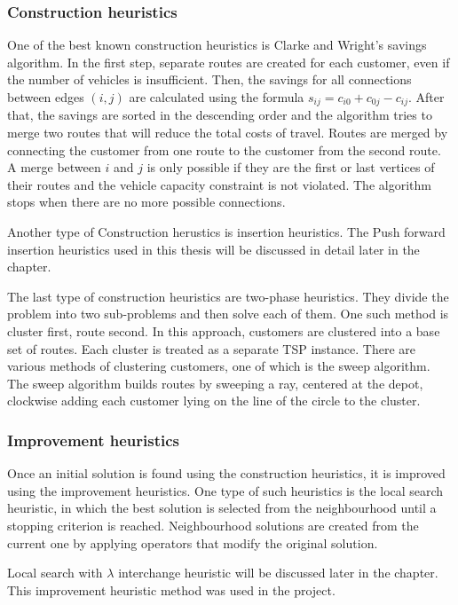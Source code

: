 \documentclass[a4paper,twoside,12pt]{book}
\begin{document}
\subsubsection{Construction heuristics}
One of the best known construction heuristics is Clarke and Wright's savings algorithm. In the first step, separate routes are created for each customer, even if the number of vehicles is insufficient. Then, the  savings for all connections between edges $(i, j)$ are calculated using the formula $s_{ij} = c_{i0} + c_{0j} - c_{ij}$. After that, the savings are sorted in the descending order and the algorithm tries to merge two routes that will reduce the total costs of travel. Routes are merged by connecting the customer from one route to the customer from the second route. A merge between $i$ and $j$ is only possible if they are the first or last vertices of their routes and the vehicle capacity constraint is not violated. The algorithm stops when there are no more possible connections.

Another type of Construction herustics is insertion heuristics. The Push forward insertion heuristics used in this thesis will be discussed in detail later in the chapter.

The last type of construction heuristics are two-phase heuristics. They divide the problem into two sub-problems and then solve each of them. One such method is cluster first, route second. In this approach, customers are clustered into a base set of routes. Each cluster is treated as a separate TSP instance. There are various methods of clustering customers, one of which is the sweep algorithm. The sweep algorithm builds routes by sweeping a ray, centered at the depot, clockwise adding each customer lying on the line of the circle to the cluster.
\subsubsection{Improvement heuristics}
Once an initial solution is found using the construction heuristics, it is improved using the improvement heuristics. One type of such heuristics is the local search heuristic, in which the best solution is selected from the neighbourhood until a stopping criterion is reached. Neighbourhood solutions are created from the current one by applying operators that modify the original solution. 

Local search with $\lambda$ interchange heuristic will be discussed later in the chapter. This improvement heuristic method was used in the project.
\end{document}
